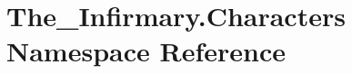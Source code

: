 \hypertarget{namespace_the___infirmary_1_1_characters}{}\section{The\+\_\+\+Infirmary.\+Characters Namespace Reference}
\label{namespace_the___infirmary_1_1_characters}
